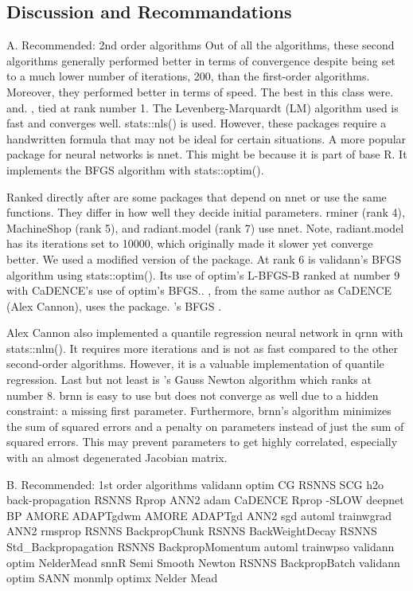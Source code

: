 \hypertarget{discussion-and-recommandations}{%
\subsection{Discussion and
Recommandations}\label{discussion-and-recommandations}}

A. Recommended: 2nd order algorithms Out of all the algorithms, these
second algorithms generally performed better in terms of convergence
despite being set to a much lower number of iterations, 200, than the
first-order algorithms. Moreover, they performed better in terms of
speed. The best in this class were.  and.
, tied at rank number 1. The Levenberg-Marquardt (LM)
algorithm used is fast and converges well. stats::nls() is used.
However, these packages require a handwritten formula that may not be
ideal for certain situations. A more popular package for neural networks
is nnet. This might be because it is part of base R. It implements the
BFGS algorithm with stats::optim().

Ranked directly after are some packages that depend on nnet or use the
same functions. They differ in how well they decide initial parameters.
rminer (rank 4), MachineShop (rank 5), and radiant.model (rank 7) use
nnet. Note, radiant.model has its iterations set to 10000, which
originally made it slower yet converge better. We used a modified
version of the package. At rank 6 is validann's BFGS algorithm using
stats::optim(). Its use of optim's L-BFGS-B ranked at number 9 with
CaDENCE's use of optim's BFGS.. , from the same author
as CaDENCE (Alex Cannon), uses the package. 's BFGS
\citep{R-optimx}.

Alex Cannon also implemented a quantile regression neural network in
qrnn with stats::nlm(). It requires more iterations and is not as fast
compared to the other second-order algorithms. However, it is a valuable
implementation of quantile regression. Last but not least is
's Gauss Newton algorithm which ranks at number 8. brnn is
easy to use but does not converge as well due to a hidden constraint: a
missing first parameter. Furthermore, brnn's algorithm minimizes the sum
of squared errors and a penalty on parameters instead of just the sum of
squared errors. This may prevent parameters to get highly correlated,
especially with an almost degenerated Jacobian matrix.

B. Recommended: 1st order algorithms validann optim CG RSNNS SCG h2o
back-propagation RSNNS Rprop ANN2 adam CaDENCE Rprop -SLOW deepnet BP
AMORE ADAPTgdwm AMORE ADAPTgd ANN2 sgd automl trainwgrad ANN2 rmsprop
RSNNS BackpropChunk RSNNS BackWeightDecay RSNNS Std\_Backpropagation
RSNNS BackpropMomentum automl trainwpso validann optim NelderMead snnR
Semi Smooth Newton RSNNS BackpropBatch validann optim SANN monmlp optimx
Nelder Mead


